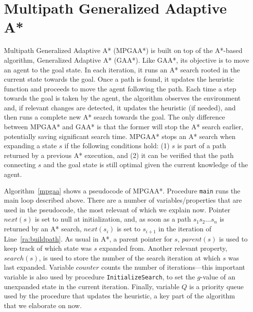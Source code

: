 \documentclass{article}
\begin{document}
\section{Multipath Generalized Adaptive A*}
Multipath Generalized Adaptive A* (MPGAA*) is built on top of the A*-based algorithm, Generalized Adaptive A* \cite{SunKY08} (GAA*). Like GAA*, its objective is to move an agent to the goal state. In each iteration, it runs an A* search rooted in the current state towards the goal. Once a path is found, it updates the heuristic function and proceeds to move the agent following the path. Each time a step towards the goal is taken by the agent, the algorithm observes the environment and, if relevant changes are detected, it updates the heuristic (if needed), and then runs a complete new A* search towards the goal. The only difference between MPGAA* and GAA* is that the former will stop the A* search earlier,  potentially saving significant search time. MPGAA* stops an A* search when expanding a state $s$ if the following conditions hold: (1) $s$ is part of a path returned by a previous A* execution, and (2) it can be verified that the path connecting $s$ and the goal state is still optimal given the current knowledge of the agent.

Algorithm~\ref{mpgaa} shows a pseudocode of MPGAA*. Procedure \texttt{main} runs the main loop described above. There are a number of variables/properties that are used in the pseudocode, the most relevant of which we explain now.
Pointer $next(s)$ is set to null at initialization, and, as soon as a path $s_1s_2\ldots s_n$ is returned by an A* search, $next(s_i)$ is set to $s_{i+1}$ in the iteration of Line~\ref{ra:buildpath}. As usual in A*, a parent pointer for $s$, $parent(s)$ is used to keep track of which state was $s$ expanded from. Another relevant property, $search(s)$, is used to store the number of the search iteration at which $s$ was last expanded. Variable  $counter$ counts the number of iterations---this important variable is also used by procedure \texttt{InitializeSearch}, to set the $g$-value of an unexpanded state in the current iteration. Finally, variable $Q$ is a priority queue used by the procedure that updates the heuristic, a key part of the algorithm that we elaborate on now.
\end{document}
